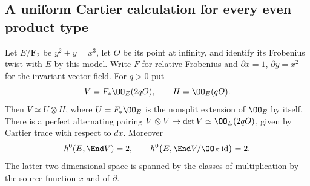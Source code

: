 \subsection{A uniform Cartier calculation for every even product type}
\label{sec:DE-A3-all-ss-rectangles}

\begin{lemma}
\label{lem:DE-A3-ss-Frobenius-endomorphisms}
Let $E/\mathbf F_2$ be $y^2+y=x^3$, let $O$ be its point at infinity,
and identify its Frobenius twist with $E$ by this model.  Write $F$ for
relative Frobenius and $\partial x=1$, $\partial y=x^2$ for the invariant
vector field.  For $q>0$ put
\[
 V=F_*\OO_E(2qO),\qquad H=\OO_E(qO).
\]
Then $V\simeq U\otimes H$, where $U=F_*\OO_E$ is the nonsplit extension
of $\OO_E$ by itself.  There is a perfect alternating pairing
$V\otimes V\to\det V\simeq\OO_E(2qO)$, given by Cartier trace with
respect to $dx$.  Moreover
\[
 h^0(E,\End V)=2,\qquad
 h^0\bigl(E,\End V/\OO_E\operatorname{id}\bigr)=2.
\]
The latter two-dimensional space is spanned by the classes of
multiplication by the source function $x$ and of $\partial$.
\end{lemma}
